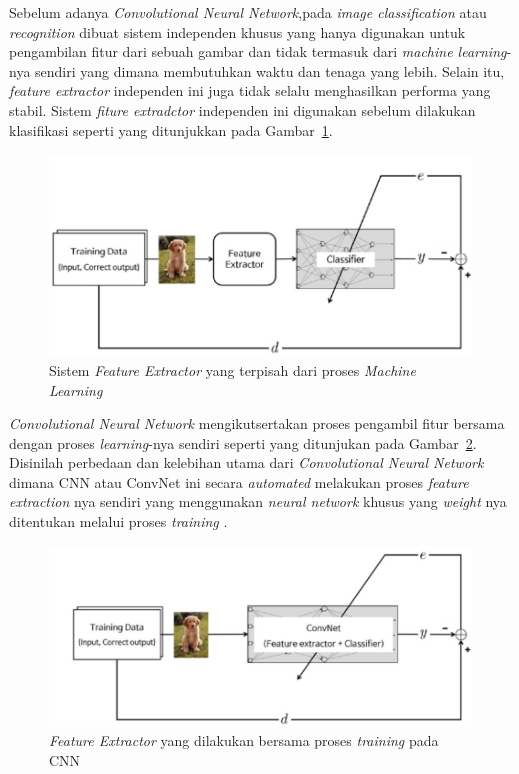 \par Sebelum adanya \emph{Convolutional Neural Network},pada \emph{image classification} atau \emph{recognition} dibuat sistem independen khusus yang hanya digunakan
untuk pengambilan fitur dari sebuah gambar dan tidak termasuk dari \emph{machine learning}-nya sendiri yang dimana membutuhkan waktu dan tenaga yang lebih. Selain itu, \emph{feature extractor}
independen ini juga tidak selalu menghasilkan performa yang stabil. Sistem \emph{fiture extradctor} independen ini digunakan sebelum dilakukan klasifikasi seperti yang ditunjukkan pada Gambar~\ref{fig:imgecog_beforeconv}.


\begin{figure}[ht]
    \centering
    \includegraphics[scale=0.8]{gambar/imgrecog_beforconv.jpg}
    \caption{Sistem \emph{Feature Extractor} yang terpisah dari proses \emph{Machine Learning}}
    \label{fig:imgecog_beforeconv}  
\end{figure}

\par \emph{Convolutional Neural Network} mengikutsertakan proses pengambil fitur bersama dengan 
proses \emph{learning}-nya sendiri seperti yang ditunjukan pada Gambar~\ref{fig:imgrecog_afterconv}. Disinilah perbedaan dan kelebihan utama dari \emph{Convolutional Neural Network}
dimana CNN atau ConvNet ini secara \emph{automated} melakukan proses \emph{feature extraction} nya sendiri yang
menggunakan \emph{neural network} khusus yang \emph{weight} nya ditentukan melalui proses \emph{training} \cite{kim2018safety}.

\begin{figure}[ht]
    \centering
    \includegraphics[scale=0.8]{gambar/imgrecog_afterconv.jpg}
    \caption{\emph{Feature Extractor} yang dilakukan bersama proses \emph{training} pada CNN}
    \label{fig:imgrecog_afterconv}  
\end{figure}




